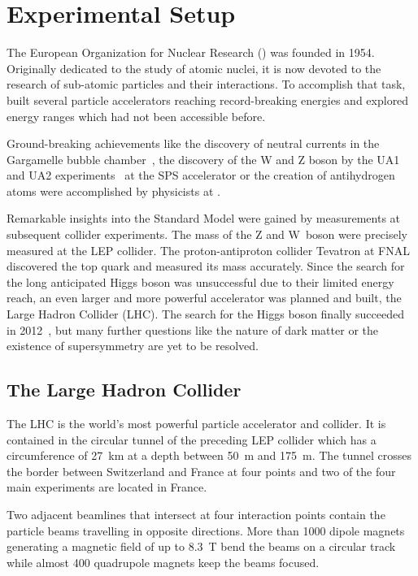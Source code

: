 
\chapter{Experimental Setup}
\label{sec:experimental_setup}

The European Organization for Nuclear Research (\CERN) was founded in 1954.
Originally dedicated to the study of atomic nuclei, it is now devoted to the
research of sub-atomic particles and their interactions. To accomplish that
task, \CERN built several particle accelerators reaching record-breaking
energies and explored energy ranges which had not been accessible before.

Ground-breaking achievements like the discovery of neutral currents in the
Gargamelle bubble chamber~\cite{Hasert:1973ff}, the discovery of the W and Z
boson by the UA1 and UA2 experiments~\cite{Arnison:1983rp} at the SPS
accelerator or the creation of antihydrogen atoms were accomplished by physicists at
\CERN.

Remarkable insights into the Standard Model were gained by measurements at
subsequent collider experiments. The mass of the Z and W~boson were precisely
measured at the LEP collider. The proton-antiproton collider Tevatron at FNAL
discovered the top quark and measured its mass accurately. Since the search
for the long anticipated Higgs boson was unsuccessful due to their limited energy
reach, an even larger and more powerful accelerator was planned and built, the
Large Hadron Collider (LHC). The search for the Higgs boson finally succeeded in
2012~\cite{Chatrchyan:2012xdj,Aad:2012tfa}, but many further questions like the
nature of dark matter or the existence of supersymmetry are yet to be resolved.

\section{The Large Hadron Collider}

The LHC is the world's most powerful particle accelerator and collider. It
is contained in the circular tunnel of the preceding LEP collider which has a
circumference of \SI{27}{\kilo \meter} at a depth between \SI{50}{\meter} and
\SI{175}{\meter}.  The tunnel crosses the border between Switzerland and France
at four points and two of the four main experiments are located in France. 

Two adjacent beamlines that intersect at four interaction points contain the
particle beams travelling in opposite directions. More than 1000 dipole magnets
generating a magnetic field of up to \SI{8.3}{\tesla} bend the beams on
a circular track while almost 400 quadrupole magnets keep the beams focused. 

